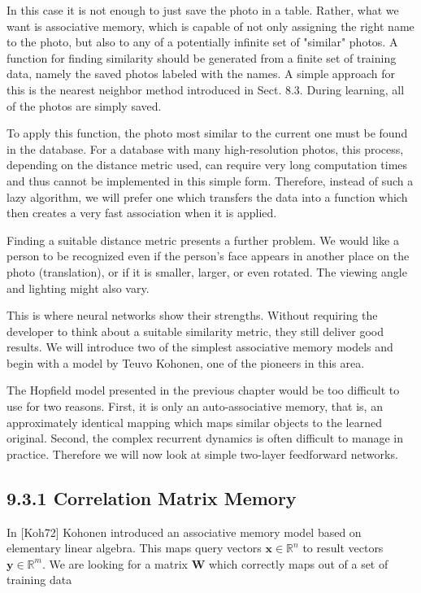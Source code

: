 \documentclass[10pt]{article}
\begin{document}
In this case it is not enough to just save the photo in a table. Rather, what we want is associative memory, which is capable of not only assigning the right name to the photo, but also to any of a potentially infinite set of "similar" photos. A function for finding similarity should be generated from a finite set of training data, namely the saved photos labeled with the names. A simple approach for this is the nearest neighbor method introduced in Sect. 8.3. During learning, all of the photos are simply saved.

To apply this function, the photo most similar to the current one must be found in the database. For a database with many high-resolution photos, this process, depending on the distance metric used, can require very long computation times and thus cannot be implemented in this simple form. Therefore, instead of such a lazy algorithm, we will prefer one which transfers the data into a function which then creates a very fast association when it is applied.

Finding a suitable distance metric presents a further problem. We would like a person to be recognized even if the person's face appears in another place on the photo (translation), or if it is smaller, larger, or even rotated. The viewing angle and lighting might also vary.

This is where neural networks show their strengths. Without requiring the developer to think about a suitable similarity metric, they still deliver good results. We will introduce two of the simplest associative memory models and begin with a model by Teuvo Kohonen, one of the pioneers in this area.

The Hopfield model presented in the previous chapter would be too difficult to use for two reasons. First, it is only an auto-associative memory, that is, an approximately identical mapping which maps similar objects to the learned original. Second, the complex recurrent dynamics is often difficult to manage in practice. Therefore we will now look at simple two-layer feedforward networks.

\subsection*{9.3.1 Correlation Matrix Memory}
In [Koh72] Kohonen introduced an associative memory model based on elementary linear algebra. This maps query vectors $\boldsymbol{x} \in \mathbb{R}^{n}$ to result vectors $\boldsymbol{y} \in \mathbb{R}^{m}$. We are looking for a matrix $\boldsymbol{W}$ which correctly maps out of a set of training data
\end{document}
